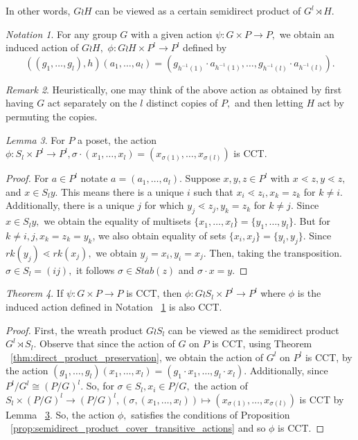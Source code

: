 \documentclass[10 pt]{amsart}
\theoremstyle{plain}
\theoremstyle{definition}
\theoremstyle{remark}
\numberwithin{equation}{section}
\newtheorem{thm}{Theorem}[section]
\newtheorem{lem}[thm]{Lemma}
\theoremstyle{remark}
\newtheorem{rem}[thm]{Remark}
\newtheorem{note}[thm]{Notation}
\begin{document}
In other words, $G\wr H$ can be viewed as a certain semidirect product of $G^l \rtimes H.$

\begin{note}
\label{note:wreath_action}
For any group $G$ with a given action $\psi:G\times P \rightarrow P,$ we obtain an induced action of $G \wr H,$ $\phi:G \wr H \times P^l \rightarrow P^l$ defined by 
$$((g_1,\ldots, g_l),h)(a_1,\ldots, a_l) = (g_{h^{-1}(1)}\cdot a_{h^{-1}(1)},\ldots,g_{h^{-1}(l)} \cdot a_{h^{-1}(l)}).$$
\end{note}

\begin{rem}
Heuristically, one may think of the above action as obtained by first having $G$ act separately on the $l$ distinct copies of $P,$ and then letting $H$ act by permuting the copies.
\end{rem}

\begin{lem}
\label{lem:symmetric_group_product_action}
For $P$ a poset, the action $\phi:S_l \times P^l \rightarrow P^l,\sigma \cdot(x_1,\ldots, x_l) = (x_{\sigma(1)},\ldots, x_{\sigma(l)})$ is CCT.
\end{lem}
\begin{proof}
For $a \in P^l$ notate $a = (a_1,\ldots, a_l).$ Suppose $x,y,z \in P^l$ with $x\lessdot z,y\lessdot z,$ and $x \in S_ly.$ This means there is a unique $i$ such that $x_i \lessdot z_i,x_k = z_k$ for $k \neq i.$ Additionally, there is a unique $j$ for which $y_j \lessdot z_j,y_k =z_k$ for $k \neq j.$ Since $x \in S_ly,$ we obtain the equality of multisets $\{x_1,\ldots, x_l\}=\{y_1,\ldots,y_l\}.$ But for $k \neq i,j,x_k = z_k = y_k$, we also obtain equality of sets $\{x_i,x_j\} = \{y_i,y_j\}.$ Since $rk(y_j) \lessdot rk(x_j),$ we obtain $y_j = x_i,y_i = x_j.$ Then, taking the transposition. $\sigma \in S_l = (ij),$ it follows $\sigma \in Stab(z)$ and $\sigma \cdot x = y.$
\end{proof}

\begin{thm}
\label{thm:wreath_preservation}
If $\psi:G\times P \rightarrow P$ is CCT, then $\phi:G\wr S_l \times P^l \rightarrow P^l$ where $\phi$ is the induced action defined in Notation ~\ref{note:wreath_action} is also CCT.
\end{thm}
\begin{proof}
First, the wreath product $G \wr S_l$ can be viewed as the semidirect product $G^l \rtimes S_l.$ Observe that since the action of $G$ on $P$ is CCT, using Theorem ~\ref{thm:direct_product_preservation}, we obtain the action of $G^l$ on $P^l$ is CCT, by the action $(g_1,\ldots, g_l)(x_1,\ldots, x_l) = (g_1 \cdot x_1,\ldots, g_l \cdot x_l).$ Additionally, since $P^l/G^l \cong (P/G)^l.$ So, for $\sigma \in S_l,x_i \in P/G,$ the action of $S_l \times (P/G)^l \rightarrow (P/G)^l,(\sigma ,(x_1,\ldots, x_l)) \mapsto (x_{\sigma(1)},\ldots, x_{\sigma(l)})$ is CCT by Lemma ~\ref{lem:symmetric_group_product_action}. So, the action $\phi,$ satisfies the conditions of Proposition ~\ref{prop:semidirect_product_cover_transitive_actions} and so $\phi$ is CCT.
\end{proof}
\end{document}
